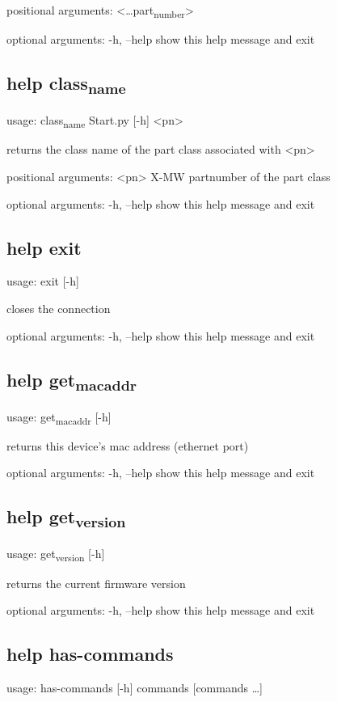 \documentclass[11pt]{article}
\begin{document}
positional arguments:
  <\ldots{}part\textsubscript{number}>

optional arguments:
  -h, --help        show this help message and exit

\subsection{help class\textsubscript{name}}
\label{sec:org8672728}
usage: class\textsubscript{name} Start.py [-h] <pn>

returns the class name of the part class associated with <pn>

positional arguments:
  <pn>        X-MW partnumber of the part class

optional arguments:
  -h, --help  show this help message and exit

\subsection{help exit}
\label{sec:org3d30b62}
usage: exit [-h]

closes the connection

optional arguments:
  -h, --help  show this help message and exit

\subsection{help get\textsubscript{mac}\textsubscript{addr}}
\label{sec:org5a5f8cd}
usage: get\textsubscript{mac}\textsubscript{addr} [-h]

returns this device's mac address (ethernet port)

optional arguments:
  -h, --help  show this help message and exit

\subsection{help get\textsubscript{version}}
\label{sec:org52ab88c}
usage: get\textsubscript{version} [-h]

returns the current firmware version

optional arguments:
  -h, --help  show this help message and exit

\subsection{help has-commands}
\label{sec:org5dfb0d9}
usage: has-commands [-h] commands [commands \ldots{}]
\end{document}
